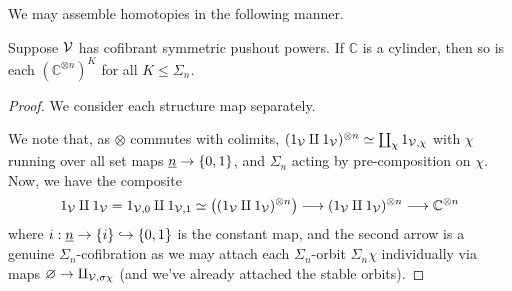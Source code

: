 \documentclass[a4paper,10pt
,draft
]{article}%
\renewcommand{\1}{\ensuremath{\mathbb{id}}}
\begin{document}
We may assemble homotopies in the following manner.

\begin{lemma}
      \label{ASSEM_HOM_LEM}
      Suppose $\mathcal V$ has cofibrant symmetric pushout powers.
      If $\mathbb C$ is a cylinder, then so is each $\left(\mathbb C^{\otimes n}\right)^{K}$ for all $K \leq \Sigma_n$.
\end{lemma}
\begin{proof}
      We consider each structure map separately.
      
      We note that, as $\otimes$ commutes with colimits,
      $(1_{\mathcal V} \amalg 1_{\mathcal V})^{\otimes n} \simeq \coprod_{\chi} 1_{\mathcal V,\chi}$
      with $\chi$ running over all set maps $\underline{n} \to \left\{0,1\right\}$,
      and $\Sigma_n$ acting by pre-composition on $\chi$.
      Now, we have the composite
      \begin{equation}
            1_{\mathcal V} \amalg 1_{\mathcal V} = 1_{\mathcal V, 0} \amalg 1_{\mathcal V, 1}
            \simeq
            \left((1_{\mathcal V} \amalg 1_{\mathcal V})^{\otimes n}\right)
            \longrightarrow
            (1_{\mathcal V} \amalg 1_{\mathcal V})^{\otimes n}
            \longrightarrow
            \mathbb C^{\otimes n}
      \end{equation}
      where $i: \underline{n} \to \left\{i\right\} \hookrightarrow \left\{0,1\right\}$ is the constant map,
      and the second arrow is a genuine $\Sigma_n$-cofibration
      as we may attach each $\Sigma_n$-orbit $\Sigma_n \chi$ individually via maps $\varnothing \to \amalg_{\mathcal V,\sigma\chi}$
      (and we've already attached the stable orbits).


\end{proof}
\end{document}
